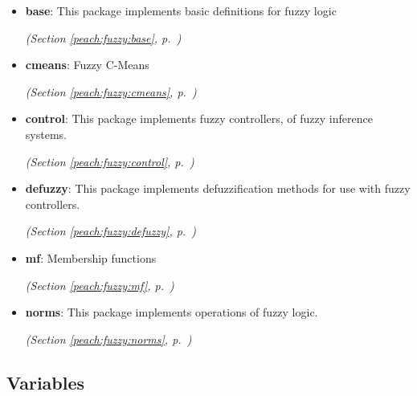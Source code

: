 \begin{itemize}
\setlength{\parskip}{0ex}
\item \textbf{base}: 
This package implements basic definitions for fuzzy logic


  \textit{(Section \ref{peach:fuzzy:base}, p.~\pageref{peach:fuzzy:base})}

\item \textbf{cmeans}: 
Fuzzy C-Means


  \textit{(Section \ref{peach:fuzzy:cmeans}, p.~\pageref{peach:fuzzy:cmeans})}

\item \textbf{control}: 
This package implements fuzzy controllers, of fuzzy inference systems.


  \textit{(Section \ref{peach:fuzzy:control}, p.~\pageref{peach:fuzzy:control})}

\item \textbf{defuzzy}: 
This package implements defuzzification methods for use with fuzzy controllers.


  \textit{(Section \ref{peach:fuzzy:defuzzy}, p.~\pageref{peach:fuzzy:defuzzy})}

\item \textbf{mf}: 
Membership functions


  \textit{(Section \ref{peach:fuzzy:mf}, p.~\pageref{peach:fuzzy:mf})}

\item \textbf{norms}: 
This package implements operations of fuzzy logic.


  \textit{(Section \ref{peach:fuzzy:norms}, p.~\pageref{peach:fuzzy:norms})}

\end{itemize}



  \subsection{Variables}

